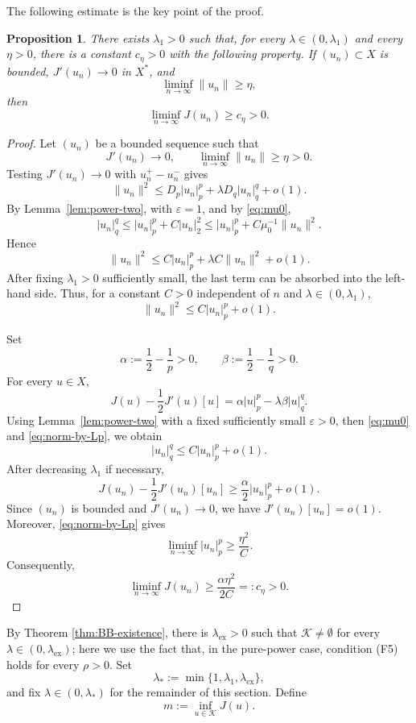 \documentclass[10pt,a4paper]{amsart}
\numberwithin{equation}{section}
\newtheorem{proposition}[theorem]{Proposition}
\newcommand{\cK}{\mathcal{K}}
\newcommand{\eps}{\varepsilon}
\begin{document}
The following estimate is the key point of the proof.

\begin{proposition}\label{prop:positive-ps}
There exists $\lambda_1>0$ such that, for every
$\lambda\in(0,\lambda_1)$ and every $\eta>0$, there is a constant
$c_\eta>0$ with the following property. If $(u_n)\subset X$ is bounded,
$J'(u_n)\to0$ in $X^*$, and
\[
\liminf_{n\to\infty}\|u_n\|\ge\eta,
\]
then
\[
\liminf_{n\to\infty}J(u_n)\ge c_\eta>0.
\]
\end{proposition}

\begin{proof}
Let $(u_n)$ be a bounded sequence such that
\[
J'(u_n)\to0,
\qquad
\liminf_{n\to\infty}\|u_n\|\ge\eta>0.
\]
Testing $J'(u_n)\to0$ with $u_n^+-u_n^-$ gives
\[
\|u_n\|^2
\le D_p|u_n|_p^p+\lambda D_q|u_n|_q^q+o(1).
\]
By Lemma~\ref{lem:power-two}, with $\eps=1$, and by \eqref{eq:mu0},
\[
|u_n|_q^q\le |u_n|_p^p+C|u_n|_2^2
\le |u_n|_p^p+C\mu_0^{-1}\|u_n\|^2.
\]
Hence
\[
\|u_n\|^2
\le C|u_n|_p^p+\lambda C\|u_n\|^2+o(1).
\]
After fixing $\lambda_1>0$ sufficiently small, the last term can be
absorbed into the left-hand side. Thus, for a constant $C>0$ independent of
$n$ and $\lambda\in(0,\lambda_1)$,
\begin{equation}\label{eq:norm-by-Lp}
\|u_n\|^2\le C|u_n|_p^p+o(1).
\end{equation}

Set
\[
\alpha:=\frac12-\frac1p>0,
\qquad
\beta:=\frac12-\frac1q>0.
\]
For every $u\in X$,
\[
J(u)-\frac12J'(u)[u]
=
\alpha |u|_p^p-\lambda\beta |u|_q^q.
\]
Using Lemma~\ref{lem:power-two} with a fixed sufficiently small $\eps>0$,
then \eqref{eq:mu0} and \eqref{eq:norm-by-Lp}, we obtain
\[
|u_n|_q^q\le C|u_n|_p^p+o(1).
\]
After decreasing $\lambda_1$ if necessary,
\[
J(u_n)-\frac12J'(u_n)[u_n]
\ge \frac{\alpha}{2}|u_n|_p^p+o(1).
\]
Since $(u_n)$ is bounded and $J'(u_n)\to0$, we have
$J'(u_n)[u_n]=o(1)$. Moreover, \eqref{eq:norm-by-Lp} gives
\[
\liminf_{n\to\infty}|u_n|_p^p\ge \frac{\eta^2}{C}.
\]
Consequently,
\[
\liminf_{n\to\infty}J(u_n)
\ge \frac{\alpha\eta^2}{2C}=:c_\eta>0.
\]
\end{proof}

By Theorem \ref{thm:BB-existence}, there is $\lambda_{\mathrm{ex}}>0$
such that $\cK\neq\emptyset$ for every
$\lambda\in(0,\lambda_{\mathrm{ex}})$; here we use the fact that, in
the pure-power case, condition (F5) holds for every $\rho>0$. Set
\[
\lambda_*:=\min\{1,\lambda_1,\lambda_{\mathrm{ex}}\},
\]
and fix $\lambda\in(0,\lambda_*)$ for the remainder of this section.
Define
\[
m:=\inf_{u\in\cK}J(u).
\]
\end{document}
